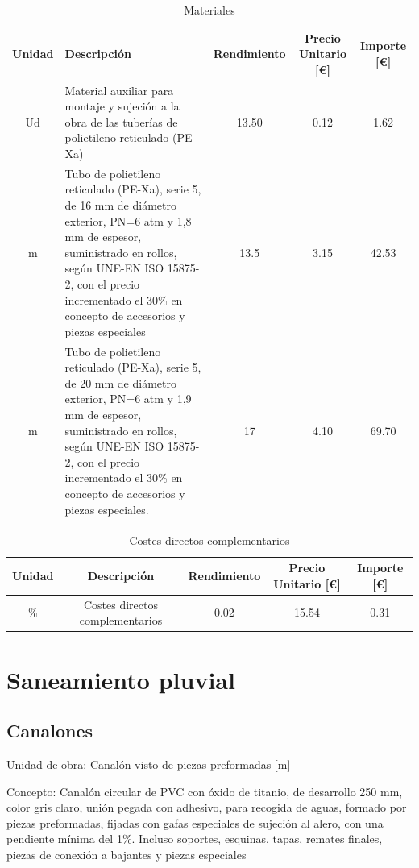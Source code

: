\documentclass[../main.tex]{subfiles}
\begin{document}
\begin{table}[H]
    \centering
    \begin{tabular}{c|p{5.5cm}|c|c|c}
    Unidad & Descripción & Rendimiento & Precio Unitario [€] & Importe [€] \\ \hline
    Ud & Material auxiliar para montaje y sujeción a la obra de las tuberías de polietileno reticulado (PE-Xa) & 13.50 & 0.12 & 1.62 \\
    m & Tubo de polietileno reticulado (PE-Xa), serie 5, de 16 mm de diámetro exterior, PN=6 atm y 1,8 mm de espesor, suministrado en rollos, según UNE-EN ISO 15875-2, con el precio incrementado el 30\% en concepto de accesorios y piezas especiales & 13.5 & 3.15 & 42.53 \\
    m & Tubo de polietileno reticulado (PE-Xa), serie 5, de 20 mm de diámetro exterior, PN=6 atm y 1,9 mm de espesor, suministrado en rollos, según UNE-EN ISO 15875-2, con el precio incrementado el 30\% en concepto de accesorios y piezas especiales. & 17 & 4.10 & 69.70 \\
    
    \end{tabular}
    \caption{Materiales}
\end{table}

\begin{table}[H]
    \centering
    \begin{tabular}{c|c|c|c|c}
    Unidad & Descripción & Rendimiento & Precio Unitario [€] & Importe [€] \\ \hline
    \% & Costes directos complementarios & 0.02 & 15.54 & 0.31 \\ 
    \end{tabular}
    \caption{Costes directos complementarios}
\end{table} 

\section{Saneamiento pluvial}

\subsection{Canalones}

Unidad de obra: Canalón visto de piezas preformadas [m]

Concepto: 
Canalón circular de PVC con óxido de titanio, de desarrollo 250 mm, color gris claro, unión pegada con adhesivo, para recogida de aguas, formado por piezas preformadas, fijadas con gafas especiales de sujeción al alero, con una pendiente mínima del 1\%. Incluso soportes, esquinas, tapas, remates finales, piezas de conexión a bajantes y piezas especiales
\end{document}

